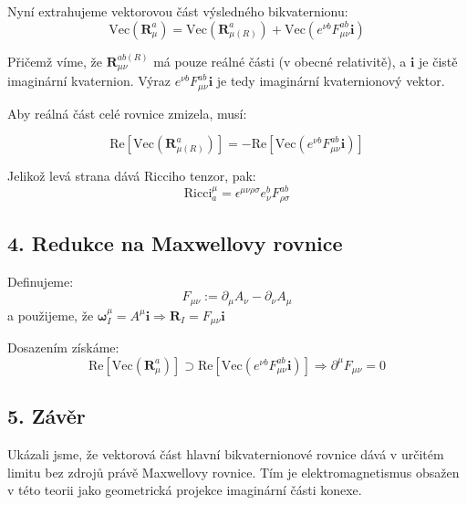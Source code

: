 Nyní extrahujeme vektorovou část výsledného bikvaternionu:
\[
\text{Vec}(\mathbf{R}^a_\mu) = \text{Vec}(\mathbf{R}^{a}_{\mu (R)}) + \text{Vec}(e^{\nu b} F_{\mu\nu}^{ab} \mathbf{i})
\]

Přičemž víme, že $\mathbf{R}_{\mu\nu}^{ab (R)}$ má pouze reálné části (v obecné relativitě), a $\mathbf{i}$ je čistě imaginární kvaternion. Výraz $e^{\nu b} F_{\mu\nu}^{ab} \mathbf{i}$ je tedy imaginární kvaternionový vektor.

Aby reálná část celé rovnice zmizela, musí:

\[
\text{Re}[\text{Vec}(\mathbf{R}^{a}_{\mu (R)})] = - \text{Re}[\text{Vec}(e^{\nu b} F_{\mu\nu}^{ab} \mathbf{i})]
\]

Jelikož levá strana dává Ricciho tenzor, pak:
\[
\text{Ricci}^\mu_a = \epsilon^{\mu\nu\rho\sigma} e^b_\nu F_{\rho\sigma}^{ab}
\]

\subsection*{4. Redukce na Maxwellovy rovnice}

Definujeme:
\[
F_{\mu\nu} := \partial_\mu A_\nu - \partial_\nu A_\mu
\]
a použijeme, že $\boldsymbol{\omega}_I^\mu = A^\mu \mathbf{i} \Rightarrow \mathbf{R}_I = F_{\mu\nu} \mathbf{i}$

Dosazením získáme:
\[
\text{Re}[\text{Vec}(\mathbf{R}^a_\mu)] \supset \text{Re}[\text{Vec}(e^{\nu b} F_{\mu\nu}^{ab} \mathbf{i})]
\Rightarrow \partial^\mu F_{\mu\nu} = 0
\]

\subsection*{5. Závěr}

Ukázali jsme, že vektorová část hlavní bikvaternionové rovnice dává v určitém limitu bez zdrojů právě Maxwellovy rovnice. Tím je elektromagnetismus obsažen v této teorii jako geometrická projekce imaginární části konexe.